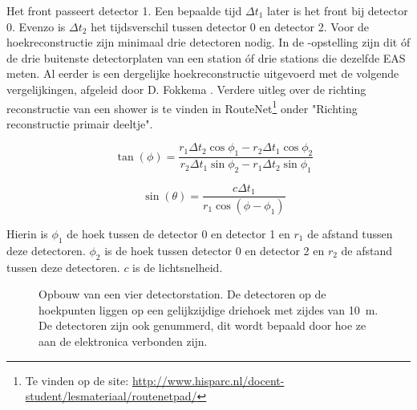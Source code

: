 Het front passeert detector 1. Een bepaalde tijd $\Delta t_1$ later is
het front bij detector 0. Evenzo is $\Delta t_2$ het tijdsverschil tussen detector 0 en detector 2. Voor
de hoekreconstructie zijn minimaal drie detectoren nodig. In de
\hisparc-opstelling zijn dit \'of de drie buitenste detectorplaten van een
station \'of drie stations die dezelfde EAS meten. Al eerder is een
dergelijke hoekreconstructie uitgevoerd met de volgende vergelijkingen,
afgeleid door D. Fokkema \cite{Fokkema}. Verdere uitleg over de richting
reconstructie van een shower is te vinden in
RouteNet\footnote{Te vinden op de site:
\url{http://www.hisparc.nl/docent-student/lesmateriaal/routenetpad/}}
onder "Richting reconstructie primair deeltje".

\begin{equation}
   \quad\tan(\phi) = \frac{r_1\Delta t_2\cos\phi_1-r_2\Delta t_1\cos\phi_2}
                          {r_2\Delta t_1\sin\phi_2-r_1\Delta t_2\sin\phi_1}
\end{equation}

\begin{equation}
    \quad\sin(\theta) = \frac{c\Delta t_1}{r_1\cos(\phi-\phi_1)}
\end{equation}

Hierin is $\phi_1$ de hoek tussen de detector 0 en detector 1 en $r_1$ de
afstand tussen deze detectoren. $\phi_2$ is de hoek tussen detector 0 en
detector 2 en $r_2$ de afstand tussen deze detectoren. $c$ is de
lichtsnelheid.

\begin{figure}
    \centering
    
    \caption{Opbouw van een vier detectorstation. De detectoren op de
             hoekpunten liggen op een gelijkzijdige driehoek met zijdes
             van \SI{10}{\meter}. De detectoren zijn ook genummerd, dit
             wordt bepaald door hoe ze aan de \hisparc elektronica
             verbonden zijn.}
    \label{fig:stationlayout} 
\end{figure}

